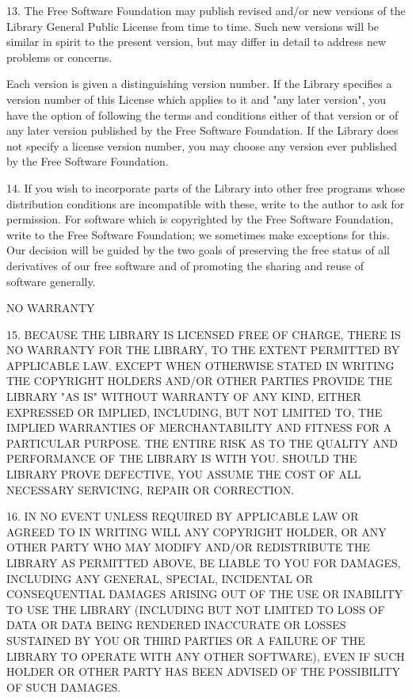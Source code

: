 \documentclass[twoside]{tceusermanual}
\begin{document}
13. The Free Software Foundation may publish revised and/or new
versions of the Library General Public License from time to
time. Such new versions will be similar in spirit to the present
version, but may differ in detail to address new problems or
concerns.

Each version is given a distinguishing version number.  If the
Library specifies a version number of this License which applies
to it and "any later version", you have the option of following
the terms and conditions either of that version or of any later
version published by the Free Software Foundation.  If the
Library does not specify a license version number, you may
choose any version ever published by the Free Software
Foundation.

14. If you wish to incorporate parts of the Library into other
free programs whose distribution conditions are incompatible
with these, write to the author to ask for permission.  For
software which is copyrighted by the Free Software Foundation,
write to the Free Software Foundation; we sometimes make
exceptions for this.  Our decision will be guided by the two
goals of preserving the free status of all derivatives of our
free software and of promoting the sharing and reuse of software
generally.

\begin{center}
NO WARRANTY
\end{center}

  15. BECAUSE THE LIBRARY IS LICENSED FREE OF CHARGE, THERE IS NO
WARRANTY FOR THE LIBRARY, TO THE EXTENT PERMITTED BY APPLICABLE LAW.
EXCEPT WHEN OTHERWISE STATED IN WRITING THE COPYRIGHT HOLDERS AND/OR
OTHER PARTIES PROVIDE THE LIBRARY "AS IS" WITHOUT WARRANTY OF ANY KIND,
EITHER EXPRESSED OR IMPLIED, INCLUDING, BUT NOT LIMITED TO, THE
IMPLIED WARRANTIES OF MERCHANTABILITY AND FITNESS FOR A PARTICULAR
PURPOSE.  THE ENTIRE RISK AS TO THE QUALITY AND PERFORMANCE OF THE
LIBRARY IS WITH YOU.  SHOULD THE LIBRARY PROVE DEFECTIVE, YOU ASSUME
THE COST OF ALL NECESSARY SERVICING, REPAIR OR CORRECTION.

  16. IN NO EVENT UNLESS REQUIRED BY APPLICABLE LAW OR AGREED TO IN
WRITING WILL ANY COPYRIGHT HOLDER, OR ANY OTHER PARTY WHO MAY MODIFY
AND/OR REDISTRIBUTE THE LIBRARY AS PERMITTED ABOVE, BE LIABLE TO YOU
FOR DAMAGES, INCLUDING ANY GENERAL, SPECIAL, INCIDENTAL OR CONSEQUENTIAL
DAMAGES ARISING OUT OF THE USE OR INABILITY TO USE THE
LIBRARY (INCLUDING BUT NOT LIMITED TO LOSS OF DATA OR DATA BEING
RENDERED INACCURATE OR LOSSES SUSTAINED BY YOU OR THIRD PARTIES OR A
FAILURE OF THE LIBRARY TO OPERATE WITH ANY OTHER SOFTWARE), EVEN IF
SUCH HOLDER OR OTHER PARTY HAS BEEN ADVISED OF THE POSSIBILITY OF SUCH DAMAGES.
\end{document}
